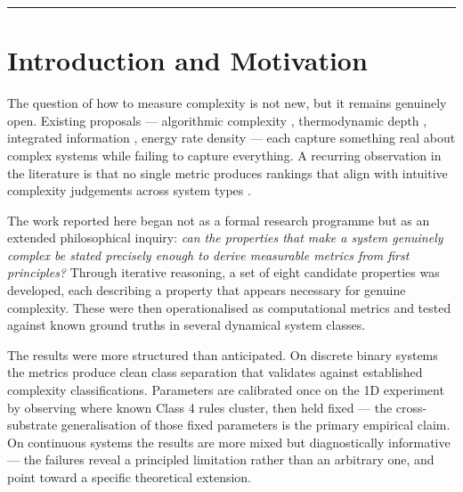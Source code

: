 \documentclass[12pt,a4paper]{article}
\begin{document}
\begin{abstract}
We make no strong claims about the completeness or correctness of this
framework.
We present it as a coherent, reproducible research programme with
unexpectedly consistent empirical results across three distinct physical
substrates, and we invite expert scrutiny of the methodology, the metric
formulations, and the theoretical grounding of the candidate properties.

\bigskip
\noindent\textbf{Keywords:} complexity measures, cellular automata,
edge of chaos, information theory, emergence, fine-tuning,
cross-substrate generalisation
\end{abstract}

\rule{\linewidth}{0.4pt}

\section{Introduction and Motivation}

The question of how to measure complexity is not new, but it remains
genuinely open.
Existing proposals — algorithmic complexity \citep{kolmogorov1965},
thermodynamic depth \citep{lloyd1988}, integrated information
\citep{tononi2004}, energy rate density \citep{chaisson2001} — each
capture something real about complex systems while failing to capture
everything.
A recurring observation in the literature is that no single metric
produces rankings that align with intuitive complexity judgements across
system types \citep{gell-mann1996, ladyman2013}.

The work reported here began not as a formal research programme but as
an extended philosophical inquiry: \emph{can the properties that make
a system genuinely complex be stated precisely enough to derive
measurable metrics from first principles?}
Through iterative reasoning, a set of eight candidate properties was developed,
each describing a property that appears necessary for genuine complexity.
These were then operationalised as computational metrics and tested
against known ground truths in several dynamical system classes.

The results were more structured than anticipated.
On discrete binary systems the metrics produce clean class separation
that validates against established complexity classifications.
Parameters are calibrated once on the 1D experiment by observing where
known Class 4 rules cluster, then held fixed — the cross-substrate
generalisation of those fixed parameters is the primary empirical claim.
On continuous systems the results are more mixed but diagnostically
informative — the failures reveal a principled limitation rather than an
arbitrary one, and point toward a specific theoretical extension.
\end{document}
